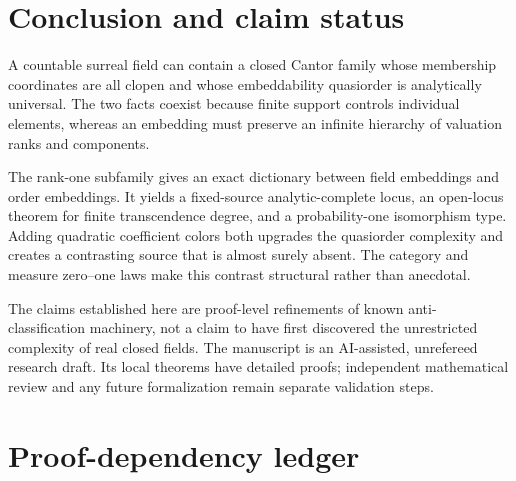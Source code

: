 \documentclass[11pt,a4paper]{article}
\numberwithin{equation}{section}
\theoremstyle{definition}
\theoremstyle{remark}
\begin{document}
\section{Conclusion and claim status}

A countable surreal field can contain a closed Cantor family whose
membership coordinates are all clopen and whose embeddability quasiorder
is analytically universal. The two facts coexist because finite support
controls individual elements, whereas an embedding must preserve an
infinite hierarchy of valuation ranks and components.

The rank-one subfamily gives an exact dictionary between field embeddings
and order embeddings. It yields a fixed-source analytic-complete locus,
an open-locus theorem for finite transcendence degree, and a probability-one
isomorphism type. Adding quadratic coefficient colors both upgrades the
quasiorder complexity and creates a contrasting source that is almost
surely absent. The category and measure zero--one laws make this contrast
structural rather than anecdotal.

The claims established here are proof-level refinements of known
anti-classification machinery, not a claim to have first discovered the
unrestricted complexity of real closed fields. The manuscript is an
AI-assisted, unrefereed research draft. Its local theorems have detailed
proofs; independent mathematical review and any future formalization remain
separate validation steps.

\appendix
\section{Proof-dependency ledger}
\label{csf:app:ledger}
\end{document}
